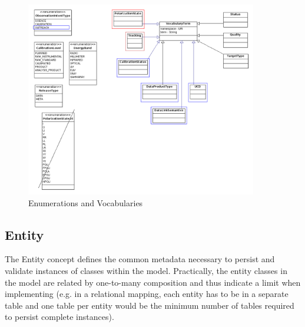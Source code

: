 \documentclass[11pt,a4paper]{ivoa}
\begin{document}
\begin{figure}
\centering
\includegraphics[width=0.9\textwidth]{src/uml/CAOM3vocabularies.png}
\caption{Enumerations and Vocabularies}
\label{fig:vocab}
\end{figure}

\subsection{Entity}

The Entity concept defines the common metadata necessary to persist and validate 
instances of classes within the model. Practically, the entity classes in the 
model are related by one-to-many composition and thus indicate a limit when
implementing (e.g. in a relational mapping, each entity has to be in a separate
table and one table per entity would be the minimum number of tables required 
to persist complete instances).
\end{document}

